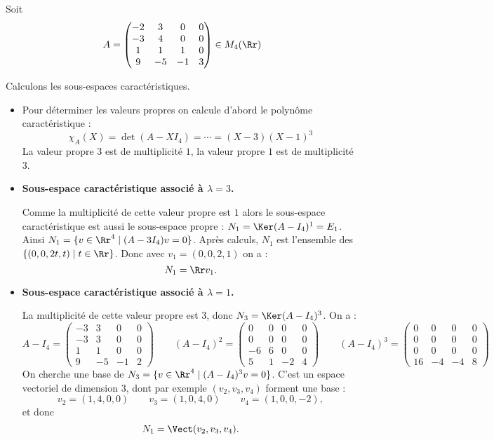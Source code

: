 \documentclass[12pt, class=report,crop=false]{standalone}
\begin{document}
\begin{exemple}
\label{ex:sscar}
Soit $$A = \begin{pmatrix}
-2 & 3 & 0 & 0 \\
-3 & 4 & 0 & 0 \\
1 & 1 & 1 & 0 \\
9 & -5 & -1 & 3
\end{pmatrix} \in M_4(\Rr)$$


Calculons les sous-espaces caractéristiques.
\begin{itemize}
  \item Pour déterminer les valeurs propres on calcule d'abord le polynôme caractéristique :
  $$\chi_A(X) = \det(A-X I_4) = \cdots = (X-3)(X-1)^3$$
  La valeur propre $3$ est de multiplicité $1$, la valeur propre $1$ est de multiplicité $3$.
  
  \item \textbf{Sous-espace caractéristique associé à $\lambda=3$.}
  
  Comme la multiplicité de cette valeur propre est $1$ alors le sous-espace caractéristique est aussi le sous-espace propre : $N_1 = \Ker(A-I_4)^1 = E_1$. 
  Ainsi $N_1 = \{ v \in \Rr^4 \mid (A-3I_4)v = 0 \}$. 
  Après calculs, $N_1$ est l'ensemble des $\{ (0,0,2t,t) \mid t\in\Rr\}$.
  Donc avec $v_1 = (0,0,2,1)$ on a :
  $$N_1 = \Rr v_1.$$
    
  
  \item \textbf{Sous-espace caractéristique associé à $\lambda=1$.}

   La multiplicité de cette valeur propre est $3$, donc
   $N_3 = \Ker (A-I_4)^3$. On a :
   $$A-I_4 = \begin{pmatrix}
-3 & 3 & 0 & 0 \\
-3 & 3 & 0 & 0 \\
1 & 1 & 0 & 0 \\
9 & -5 & -1 & 2
   \end{pmatrix}\qquad
   (A-I_4)^2 = \begin{pmatrix}
0 & 0 & 0 & 0 \\
0 & 0 & 0 & 0 \\
-6 & 6 & 0 & 0 \\
5 & 1 & -2 & 4   
   \end{pmatrix}\qquad
   (A-I_4)^3 = \begin{pmatrix}
0 & 0 & 0 & 0 \\
0 & 0 & 0 & 0 \\
0 & 0 & 0 & 0 \\
16 & -4 & -4 & 8   
   \end{pmatrix} 
$$ 
On cherche une base de $N_3 = \{ v \in \Rr^4 \mid (A-I_4)^3v = 0 \}$.
C'est un espace vectoriel de dimension $3$, dont par exemple $(v_2,v_3,v_4)$ forment une base :
$$v_2 = (1,4,0,0) \qquad v_3 = (1,0,4,0) \qquad v_4 = (1,0,0,-2),$$
et donc 
$$N_1 = \Vect(v_2,v_3,v_4).$$
\end{itemize}
\end{exemple}
\end{document}

